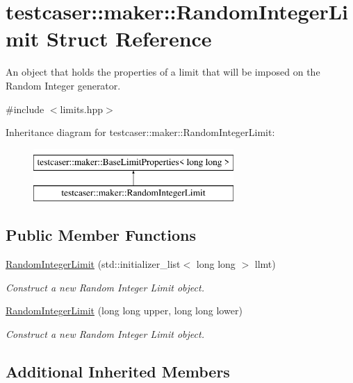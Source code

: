 \hypertarget{structtestcaser_1_1maker_1_1RandomIntegerLimit}{}\section{testcaser\+::maker\+::Random\+Integer\+Limit Struct Reference}
\label{structtestcaser_1_1maker_1_1RandomIntegerLimit}


An object that holds the properties of a limit that will be imposed on the Random Integer generator.  




{\ttfamily \#include $<$limits.\+hpp$>$}

Inheritance diagram for testcaser\+::maker\+::Random\+Integer\+Limit\+:\begin{figure}[H]
\begin{center}
\leavevmode
\includegraphics[height=2.000000cm]{structtestcaser_1_1maker_1_1RandomIntegerLimit}
\end{center}
\end{figure}
\subsection*{Public Member Functions}
\begin{DoxyCompactItemize}
\item 
\mbox{\hyperlink{structtestcaser_1_1maker_1_1RandomIntegerLimit_ae70b7c715a632c4a079a0c37452decbf}{Random\+Integer\+Limit}} (std\+::initializer\+\_\+list$<$ long long $>$ llmt)
\begin{DoxyCompactList}\small\item\em Construct a new Random Integer Limit object. \end{DoxyCompactList}\item 
\mbox{\hyperlink{structtestcaser_1_1maker_1_1RandomIntegerLimit_a43781197d959fc8ab6cf54258df35a64}{Random\+Integer\+Limit}} (long long upper, long long lower)
\begin{DoxyCompactList}\small\item\em Construct a new Random Integer Limit object. \end{DoxyCompactList}\end{DoxyCompactItemize}
\subsection*{Additional Inherited Members}


